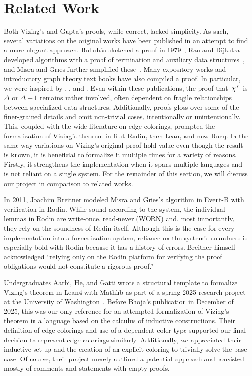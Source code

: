 \section{Related Work}\label{section related}
Both Vizing's and Gupta's proofs, while correct, lacked simplicity. As such, several variations on the original works have been published in an attempt to find a more elegant approach. Bollob\'as sketched a proof in 1979~\cite{boll}, Rao and Dijkstra developed algorithms with a proof of termination and auxiliary data structures~\cite{dijk}, and Misra and Gries further simplified these~\cite{Misra}. Many expository works and introductory graph theory text books have also compiled a proof. In particular, we were inspired by \cite{Green}, \cite{Diestel}, and \cite{GECBook}. Even within these publications, the proof that $\,\chi\,'\,$ is $\Delta$ or $\Delta + 1$ remains rather involved, often dependent on fragile relationships between specialized data structures. Additionally, proofs gloss over some of the finer-grained details and omit non-trivial cases, intentionally or unintentionally. This, coupled with the wide literature on edge colorings, prompted the formalization of Vizing's theorem in first Rodin, then Lean, and now Rocq. In the same way variations on Vizing's original proof hold value even though the result is known, it is beneficial to formalize it multiple times for a variety of reasons. Firstly, it strengthens the implementation when it spans multiple languages and is not reliant on a single system. For the remainder of this section, we will discuss our project in comparison to related works.

In 2011, Joachim Breitner modeled Misra and Gries's algorithm in Event-B with verification in Rodin\cite{Breitner}. While sound according to the system, the individual lemmas in Rodin are write-once, read-never (WORN) and, most importantly, they rely on the soundness of Rodin itself. Although this is the case for every implementation into a formalization system, reliance on the system's soundness is especially bold with Rodin because it has a history of errors. Breitner himself acknowledged ``relying only on the Rodin platform for verifying the proof obligations would not constitute a rigorous proof.''

Undergraduates Aarbi, He, and Gatti wrote a structural template to formalize Vizing's theorem in Lean4 with Mathlib as part of a spring 2025 research project at the University of Washington~\cite{math480}. Before Bhoja's publication in December of 2025, this was our only reference for an attempted formalization of Vizing's theorem in a language based on the calculus of inductive constructions. Their definition of edge colorings and use of a dependent color type supported our final decision to represent edge colorings similarly. Additionally, we appreciated their inductive set-up and the creation of an explicit coloring to trivially solve the base case. Of course, their project merely outlined a potential approach and consisted mostly of comments and statements with empty proofs.

